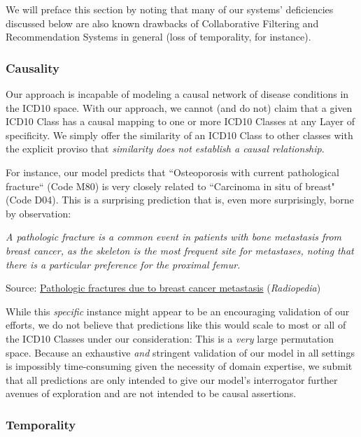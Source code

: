 \documentclass[twoside,11pt]{article}
\begin{document}
{We will preface this section by noting that many of our systems' deficiencies discussed below are also known drawbacks of Collaborative Filtering and Recommendation Systems in general (loss of temporality, for instance).

\subsubsection*{Causality}

Our approach is incapable of modeling a causal network of disease conditions in the ICD10 space. With our approach, we cannot (and do not) claim that a given ICD10 Class has a causal mapping to one or more ICD10 Classes at any Layer of specificity. We simply offer the similarity of an ICD10 Class to other classes with the explicit proviso that \textit{similarity does not establish a causal relationship}.

For instance, our model predicts that ``Osteoporosis with current pathological fracture`` (Code M80) is very closely related to ``Carcinoma in situ of breast" (Code D04). This is a surprising prediction that is, even more surprisingly, borne by observation:

\begin{displayquote}
\textit{A pathologic fracture is a common event in patients with bone metastasis from breast cancer, as the skeleton is the most frequent site for metastases, noting that there is a particular preference for the proximal femur.}

Source: \hyperlink{https://radiopaedia.org/cases/pathologic-fractures-due-to-breast-cancer-metastasis}{Pathologic fractures due to breast cancer metastasis} (\textit{Radiopedia})
\end{displayquote}


While this \textit{specific} instance might appear to be an encouraging validation of our efforts, we do not believe that predictions like this would scale to most or all of the ICD10 Classes under our consideration: This is a \textit{very} large permutation space. Because an exhaustive \textit{and} stringent validation of our model in all settings is impossibly time-consuming given the necessity of domain expertise, we submit that all predictions are only intended to give our model's interrogator further avenues of exploration and are not intended to be causal assertions.

\subsubsection*{Temporality}

}
\end{document}
